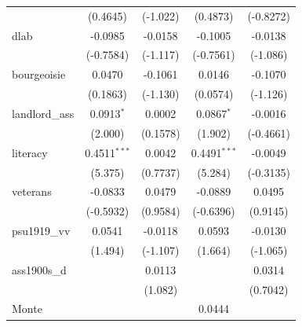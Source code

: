 \begin{table}[htbp]
\begin{tabular}{lcccc}
                                       & (0.4645)               & (-1.022)               & (0.4873)               & (-0.8272)\\   
      dlab                             & -0.0985                & -0.0158                & -0.1005                & -0.0138\\   
                                       & (-0.7584)              & (-1.117)               & (-0.7561)              & (-1.086)\\   
      bourgeoisie                      & 0.0470                 & -0.1061                & 0.0146                 & -0.1070\\   
                                       & (0.1863)               & (-1.130)               & (0.0574)               & (-1.126)\\   
      landlord\_ass                    & 0.0913$^{*}$           & 0.0002                 & 0.0867$^{*}$           & -0.0016\\   
                                       & (2.000)                & (0.1578)               & (1.902)                & (-0.4661)\\   
      literacy                         & 0.4511$^{***}$         & 0.0042                 & 0.4491$^{***}$         & -0.0049\\   
                                       & (5.375)                & (0.7737)               & (5.284)                & (-0.3135)\\   
      veterans                         & -0.0833                & 0.0479                 & -0.0889                & 0.0495\\   
                                       & (-0.5932)              & (0.9584)               & (-0.6396)              & (0.9145)\\   
      psu1919\_vv                      & 0.0541                 & -0.0118                & 0.0593                 & -0.0130\\   
                                       & (1.494)                & (-1.107)               & (1.664)                & (-1.065)\\   
      ass1900s\_d                      &                        & 0.0113                 &                        & 0.0314\\   
                                       &                        & (1.082)                &                        & (0.7042)\\   
      Monte                            &                        &                        & 0.0444                 &   \\   

\end{tabular}
\end{table}
